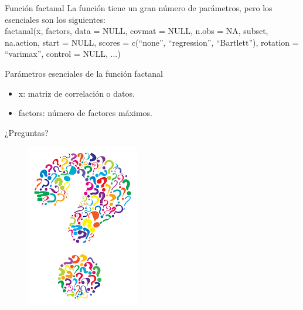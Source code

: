 \documentclass[10pt]{beamer}
\begin{document}
\begin{frame}[fragile]{Función factanal}
La función tiene un gran número de parámetros, pero los esenciales son los siguientes:\\
\vspace{10px}
factanal(x, factors, data = NULL, covmat = NULL, n.obs = NA,
subset, na.action, start = NULL,
scores = c(``none'', ``regression'', ``Bartlett''),
rotation = ``varimax'', control = NULL, ...)
\vspace{10px}
\begin{block}{Parámetros esenciales de la función factanal}
	\begin{itemize}
		\item x: matriz de correlación o datos.
		\item factors: número de factores máximos.
	\end{itemize}
\end{block}
\end{frame}

\begin{frame}[standout]
	\LARGE{¿Preguntas?}
	\vspace{10px}
	\begin{figure}
		\includegraphics[scale=0.5]{./Imagenes/preguntas.png}
	\end{figure}
\end{frame}
\end{document}
